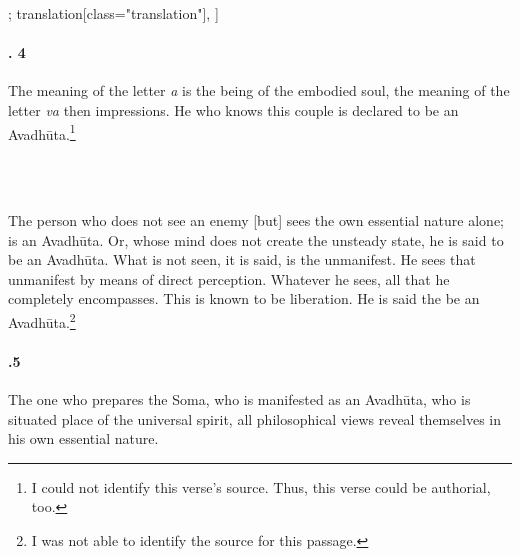 \begin{alignment}[
  texts=edition[class="edition"];
  translation[class="translation"],
  ]
\begin{translation}
\begin{tlate}[44_4]
      \paragraph{. 4} The meaning of the letter \textit{a} is the being of the embodied soul, the meaning of the letter \textit{va} then impressions. He who knows this couple is declared to be an Avadhūta.\footnote{I could not identify this verse's source. Thus, this verse could be authorial, too.}
      \end{tlate}
      \\\\
      \begin{tlate}[p44_02]
      The person who does not see an enemy [but] sees the own essential nature alone; is an Avadhūta. Or, whose mind does not create the unsteady state, he is said to be an Avadhūta. What is not seen, it is said, is the unmanifest. He sees that unmanifest by means of direct perception. Whatever he sees, all that he completely encompasses. This is known to be liberation. He is said the be an Avadhūta.\footnote{I was not able to identify the source for this passage.}
    \end{tlate}
    \begin{tlate}[44_5]
\paragraph{.5} The one who prepares the Soma, who is manifested as an Avadhūta, who is situated place of the universal spirit, all philosophical views reveal themselves in his own essential nature.
\flushpage
    \end{tlate}
  \end{translation}
\end{alignment}
\pagebreak %
